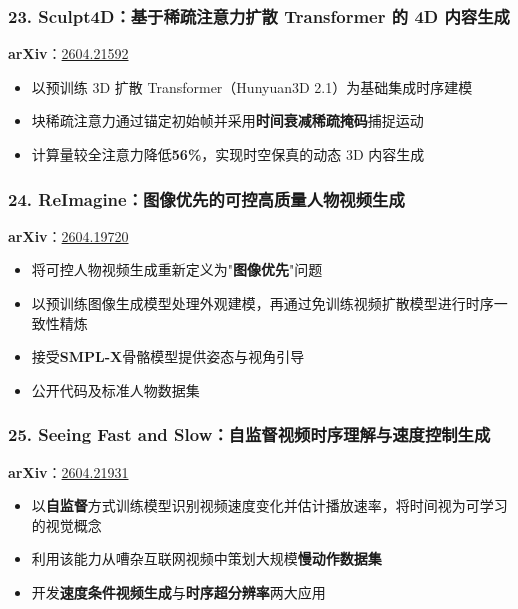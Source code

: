 \subsubsection{23. Sculpt4D：基于稀疏注意力扩散 Transformer 的 4D 内容生成}

\textbf{arXiv}：\href{https://arxiv.org/abs/2604.21592}{2604.21592}

\begin{itemize}[leftmargin=1.5em]
  \item 以预训练 3D 扩散 Transformer（Hunyuan3D 2.1）为基础集成时序建模
  \item 块稀疏注意力通过锚定初始帧并采用\textbf{时间衰减稀疏掩码}捕捉运动
  \item 计算量较全注意力降低\textbf{56\%}，实现时空保真的动态 3D 内容生成
\end{itemize}

\subsubsection{24. ReImagine：图像优先的可控高质量人物视频生成}

\textbf{arXiv}：\href{https://arxiv.org/abs/2604.19720}{2604.19720}

\begin{itemize}[leftmargin=1.5em]
  \item 将可控人物视频生成重新定义为"\textbf{图像优先}"问题
  \item 以预训练图像生成模型处理外观建模，再通过免训练视频扩散模型进行时序一致性精炼
  \item 接受\textbf{SMPL-X}骨骼模型提供姿态与视角引导
  \item 公开代码及标准人物数据集
\end{itemize}

\subsubsection{25. Seeing Fast and Slow：自监督视频时序理解与速度控制生成}

\textbf{arXiv}：\href{https://arxiv.org/abs/2604.21931}{2604.21931}

\begin{itemize}[leftmargin=1.5em]
  \item 以\textbf{自监督}方式训练模型识别视频速度变化并估计播放速率，将时间视为可学习的视觉概念
  \item 利用该能力从嘈杂互联网视频中策划大规模\textbf{慢动作数据集}
  \item 开发\textbf{速度条件视频生成}与\textbf{时序超分辨率}两大应用
\end{itemize}

